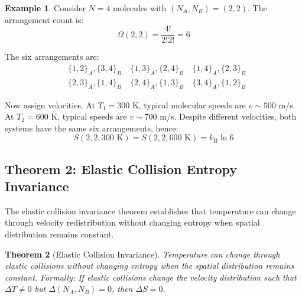 \documentclass[10pt,twocolumn,letterpaper]{article}
\newtheorem{theorem}{Theorem}[section]
\theoremstyle{definition}
\newtheorem{example}[theorem]{Example}
\theoremstyle{remark}
\newcommand{\kb}{k_\text{B}}
\newcommand{\Om}{\Omega}
\begin{document}
\begin{example}
Consider $N = 4$ molecules with $(N_A, N_B) = (2, 2)$. The arrangement count is:
\begin{equation}
\Om(2,2) = \frac{4!}{2! 2!} = 6
\end{equation}

The six arrangements are:
\begin{align}
&\{1,2\}_A, \{3,4\}_B \quad \{1,3\}_A, \{2,4\}_B \quad \{1,4\}_A, \{2,3\}_B \\
&\{2,3\}_A, \{1,4\}_B \quad \{2,4\}_A, \{1,3\}_B \quad \{3,4\}_A, \{1,2\}_B
\end{align}

Now assign velocities. At $T_1 = 300$ K, typical molecular speeds are $v \sim 500$ m/s. At $T_2 = 600$ K, typical speeds are $v \sim 700$ m/s. Despite different velocities, both systems have the same six arrangements, hence:
\begin{equation}
S(2,2; 300\text{ K}) = S(2,2; 600\text{ K}) = \kb \ln 6
\end{equation}
\end{example}

\subsection{Theorem 2: Elastic Collision Entropy Invariance}

The elastic collision invariance theorem establishes that temperature can change through velocity redistribution without changing entropy when spatial distribution remains constant.

\begin{theorem}[Elastic Collision Invariance]
\label{thm:elastic}
Temperature can change through elastic collisions without changing entropy when the spatial distribution remains constant. Formally: If elastic collisions change the velocity distribution such that $\Delta T \neq 0$ but $\Delta(N_A, N_B) = 0$, then $\Delta S = 0$.
\end{theorem}
\end{document}
